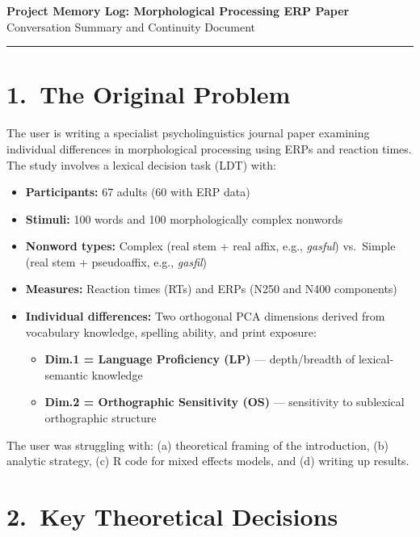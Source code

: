 \documentclass[11pt, a4paper]{article}
\begin{document}
\scriptsize

\begin{center}
  {\Large\bfseries Project Memory Log: Morphological Processing ERP Paper}\\[4pt]
  {\normalsize Conversation Summary and Continuity Document}
\end{center}

\medskip
\hrule
\bigskip

\section{1.\ The Original Problem}

The user is writing a specialist psycholinguistics journal paper examining individual differences in morphological processing using ERPs and reaction times. The study involves a lexical decision task (LDT) with:

\begin{itemize}[leftmargin=1.5em]
  \item \textbf{Participants:} 67 adults (60 with ERP data)
  \item \textbf{Stimuli:} 100 words and 100 morphologically complex nonwords
  \item \textbf{Nonword types:} Complex (real stem + real affix, e.g., \textit{gasful}) vs.\ Simple (real stem + pseudoaffix, e.g., \textit{gasfil})
  \item \textbf{Measures:} Reaction times (RTs) and ERPs (N250 and N400 components)
  \item \textbf{Individual differences:} Two orthogonal PCA dimensions derived from vocabulary knowledge, spelling ability, and print exposure:
  \begin{itemize}
    \item \textbf{Dim.1 = Language Proficiency (LP)} — depth/breadth of lexical-semantic knowledge
    \item \textbf{Dim.2 = Orthographic Sensitivity (OS)} — sensitivity to sublexical orthographic structure
  \end{itemize}
\end{itemize}

The user was struggling with: (a) theoretical framing of the introduction, (b) analytic strategy, (c) R code for mixed effects models, and (d) writing up results.

\section{2.\ Key Theoretical Decisions}
\end{document}
